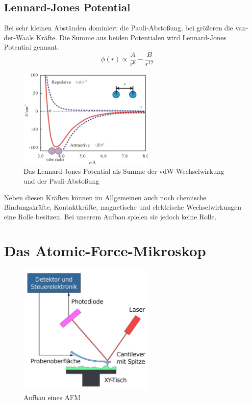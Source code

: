         \subsection{Lennard-Jones Potential}

Bei sehr kleinen Abständen dominiert die Pauli-Abstoßung, bei größeren die 
van-der-Waals Kräfte. Die Summe aus beiden Potentialen wird Lennard-Jones 
Potential gennant. 
\[
   \phi (r) \propto \frac{A}{r^6} - \frac{B}{r^{12}}    
\]

\begin{figure}[h!]
    \centering
    \includegraphics[width=0.6\textwidth]{Abb/ljp.jpg}
    \caption{Das Lennard-Jones Potential als Summe der vdW-Wechselwirkung und
             der Pauli-Abstoßung}
    \label{ljp}
\end{figure}



Neben diesen Kräften können im Allgemeinen auch noch chemische Bindungskräfte, Kontaktkräfte, magnetische und elektrische Wechselwirkungen eine Rolle besitzen.
Bei unserem Aufbau spielen sie jedoch keine Rolle.



 \section{Das Atomic-Force-Mikroskop}
 
\begin{figure}[h!]
    \centering
    \includegraphics[width=0.6\textwidth]{Abb/afm.jpg}
    \caption{Aufbau eines AFM}
    \label{afm}
\end{figure}
 
